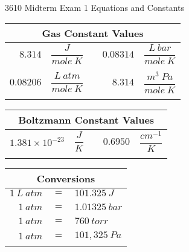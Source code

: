 \documentclass[12pt, letterpaper]{memoir}
\begin{document}
\newpage
\pagestyle{empty}
~

\vspace{-3em}
\begin{center}
	{\LARGE 3610 Midterm Exam 1 Equations and Constants}	
\end{center}

\begin{minipage}{0.57\linewidth}
\begin{mdframed}
	\begin{tabular}{rlcrl}
		\multicolumn{5}{c}{Gas Constant Values}\\ \midrule
		$8.314$ & $\dfrac{J}{mole~K}$ && $0.08314$ & $\dfrac{L~bar}{mole~K}$\\ \\
		$0.08206$ & $\dfrac{L~atm}{mole~K}$ && $8.314$ & $\dfrac{m^3~Pa}{mole~K}$\\ \\
	\end{tabular}
	\begin{tabular}{rlcrl}
		\multicolumn{5}{c}{Boltzmann Constant Values}\\ \midrule
		$1.381 \times 10^{-23}$ & $\dfrac{J}{K}$ && $0.6950$ & $\dfrac{cm^{-1}}{K}$\\ \\
	\end{tabular}
\end{mdframed}
\end{minipage}
\hspace{20pt}
\begin{minipage}{0.4\linewidth}
\begin{mdframed}
	\begin{tabular}{rcl}
		\multicolumn{3}{c}{Conversions}\\ \midrule
		$1~L~atm $ & $=$ & $101.325~J$\\ \\
		$1~atm $ & $=$ & $1.01325~bar$\\ \\
		$1~atm $ & $=$ & $760~torr$\\ \\
		$1~atm $ & $=$ & $101,325~Pa$ \\ \\
	\end{tabular}
\end{mdframed}	
\end{minipage}
\end{document}
